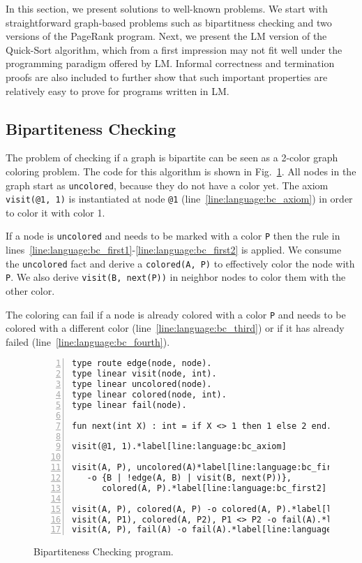 In this section, we present solutions to well-known problems. We start with
straightforward graph-based problems such as bipartitness checking and two
versions of the PageRank program. Next, we present the LM version of the
Quick-Sort algorithm, which from a first impression may not fit well under the
programming paradigm offered by LM. Informal correctness and termination proofs
are also included to further show that such important properties are relatively
easy to prove for programs written in LM.

\subsection{Bipartiteness Checking}

The problem of checking if a graph is bipartite can be seen as a 2-color graph
coloring problem.  The code for this algorithm is shown in
Fig.~\ref{language:code:bichecking}. All nodes in the graph start as
\texttt{uncolored}, because they do not have a color yet. The axiom
\texttt{visit(@1, 1)} is instantiated at node \texttt{@1}
(line~\ref{line:language:bc_axiom}) in order to color it with color 1.

If a node is \texttt{uncolored} and needs to be marked with a color \texttt{P}
then the rule in
lines~\ref{line:language:bc_first1}-\ref{line:language:bc_first2} is applied. We
consume the \texttt{uncolored} fact and derive a \texttt{colored(A, P)} to
effectively color the node with \texttt{P}. We also derive \texttt{visit(B,
next(P))} in neighbor nodes to color them with the other color. 

The coloring can fail if a node is already colored with a color \texttt{P} and
needs to be colored with a different color (line~\ref{line:language:bc_third})
or if it has already failed (line~\ref{line:language:bc_fourth}).

\begin{figure}[h!]
\begin{Verbatim}[numbers=left,fontsize=\codesize,commandchars=\*\[\]]
type route edge(node, node).
type linear visit(node, int).
type linear uncolored(node).
type linear colored(node, int).
type linear fail(node).

fun next(int X) : int = if X <> 1 then 1 else 2 end.

visit(@1, 1).*label[line:language:bc_axiom]

visit(A, P), uncolored(A)*label[line:language:bc_first1]
   -o {B | !edge(A, B) | visit(B, next(P))},
      colored(A, P).*label[line:language:bc_first2]

visit(A, P), colored(A, P) -o colored(A, P).*label[line:language:bc_second]
visit(A, P1), colored(A, P2), P1 <> P2 -o fail(A).*label[line:language:bc_third]
visit(A, P), fail(A) -o fail(A).*label[line:language:bc_fourth]
\end{Verbatim}
  \caption{Bipartiteness Checking program.}
  \label{language:code:bichecking}
\end{figure}

